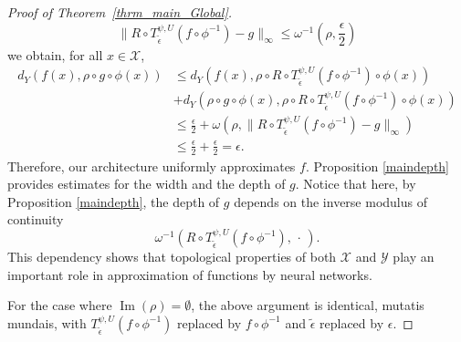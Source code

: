 \documentclass[anon,12pt]{colt2021} %
\newcommand{\xxx}{\mathcal{X}}
\newcommand{\yyy}{\mathcal{Y}}
\begin{document}
\begin{proof}[{Proof of Theorem~\ref{thrm_main_Global}}]
\begin{equation*}
    \| R \circ T_{\tilde \epsilon}^{\psi, U} (f \circ \phi^{-1}) - g \|_{\infty} \leq \omega^{-1}(\rho, \frac{\epsilon}{2})
\end{equation*}
we obtain, for all $x \in \xxx$,
\begin{align*}
    d_{Y}(f(x), \rho \circ g \circ \phi(x)) &\leq d_{Y}(f(x), \rho \circ R \circ T_{\tilde \epsilon}^{\psi, U} (f \circ \phi^{-1}) \circ \phi (x)) \\
    & + d_{Y}(\rho \circ g \circ \phi(x), \rho \circ R \circ T_{\tilde \epsilon}^{\psi, U} (f \circ \phi^{-1}) \circ \phi (x)) \\
    & \leq \frac{\epsilon}{2}+ \omega(\rho, \| R \circ T_{\tilde \epsilon}^{\psi, U} (f \circ \phi^{-1}) - g \|_{\infty}) \\
    & \leq \frac{\epsilon}{2} + \frac{\epsilon}{2}= \epsilon.
\end{align*}
Therefore, our architecture uniformly approximates $f$. Proposition \ref{maindepth} provides estimates for the width and the depth of $g$. Notice that here, by Proposition \ref{maindepth}, the depth of $g$ depends on the inverse modulus of continuity
\begin{equation*}
    \omega^{-1}(R \circ T_{\tilde \epsilon}^{\psi, U} (f \circ \phi^{-1}), \, \cdot \,).
\end{equation*}
This dependency shows that topological properties of both $\xxx$ and $\yyy$ play an important role in approximation of functions by neural networks.

For the case where $\operatorname{Im}(\rho)=\emptyset$, the above argument is identical, mutatis mundais, with $T_{\tilde{\epsilon}}^{\psi,U}(f\circ \phi^{-1})$ replaced by $f\circ \phi^{-1}$ and $\tilde{\epsilon}$ replaced by $\epsilon$.
\end{proof}
\end{document}
